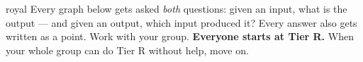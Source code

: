 \documentclass[10pt]{article}
\begin{document}

\vspace{0.15in}

\begin{scenariobox}{royal}
\small
Every graph below gets asked \emph{both} questions: given an input, what is the output --- and
given an output, which input produced it? Every answer also gets written as a point. Work with
your group. \textbf{Everyone starts at Tier R.} When your whole group can do Tier R without help,
move on.
\end{scenariobox}

\vspace{0.10in}
\end{document}
